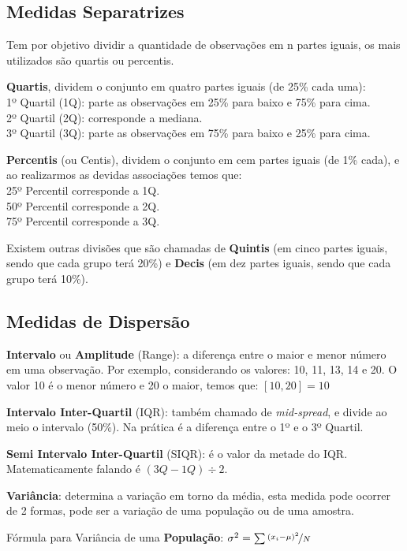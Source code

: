 \documentclass[a4paper,11pt]{article}
\begin{document}
\subsection{Medidas Separatrizes}
Tem por objetivo dividir a quantidade de observações em n partes iguais, os mais utilizados são quartis ou percentis.

\textbf{Quartis}, dividem o conjunto em quatro partes iguais (de 25\% cada uma): \\
1º Quartil (1Q): parte as observações em 25\% para baixo e 75\% para cima. \\
2º Quartil (2Q): corresponde a mediana. \\
3º Quartil (3Q): parte as observações em 75\% para baixo e 25\% para cima.

\textbf{Percentis} (ou Centis), dividem o conjunto em cem partes iguais (de 1\% cada), e ao realizarmos as devidas associações temos que: \\
25º Percentil corresponde a 1Q. \\
50º Percentil corresponde a 2Q. \\
75º Percentil corresponde a 3Q.

Existem outras divisões que são chamadas de \textbf{Quintis} (em cinco partes iguais, sendo que cada grupo terá 20\%) e \textbf{Decis} (em dez partes iguais, sendo que cada grupo terá 10\%).

\subsection{Medidas de Dispersão}

\textbf{Intervalo} ou \textbf{Amplitude} (Range): a diferença entre o maior e menor número em uma observação. Por exemplo, considerando os valores: 10, 11, 13, 14 e 20. O valor 10 é o menor número e 20 o maior, temos que: $[10,20] = 10$

\textbf{Intervalo Inter-Quartil} (IQR): também chamado de \textit{mid-spread}, e divide ao meio o intervalo (50\%). Na prática é a diferença entre o 1º e o 3º Quartil.

\textbf{Semi Intervalo Inter-Quartil} (SIQR): é o valor da metade do IQR. Matematicamente falando é $(3Q - 1Q) \div 2$.

\textbf{Variância}: determina a variação em torno da média, esta medida pode ocorrer de 2 formas, pode ser a variação de uma população ou de uma amostra.

Fórmula para Variância de uma \textbf{População}: $\sigma^2 = \sum \nicefrac{(x_{i} - \mu)^2}{N}$
\end{document}
